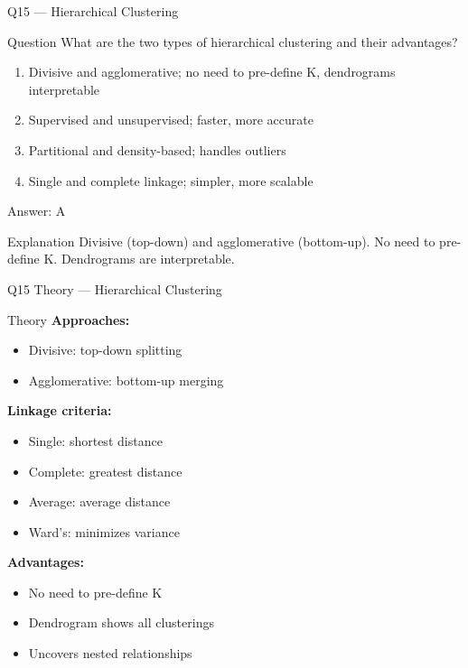 \documentclass[aspectratio=169,8pt]{beamer}
\begin{document}
	\begin{frame}{Q15 --- Hierarchical Clustering}
		\begin{block}{Question}
			What are the two types of hierarchical clustering and their advantages?
		\end{block}
		\begin{enumerate}[label=\Alph*.]
			\item Divisive and agglomerative; no need to pre-define K, dendrograms interpretable
			\item Supervised and unsupervised; faster, more accurate
			\item Partitional and density-based; handles outliers
			\item Single and complete linkage; simpler, more scalable
		\end{enumerate}
		\begin{exampleblock}{Answer: A}
		\end{exampleblock}
		\begin{block}{Explanation}
			Divisive (top-down) and agglomerative (bottom-up). No need to pre-define K. Dendrograms are interpretable.
		\end{block}
	\end{frame}
	
	\begin{frame}{Q15 Theory --- Hierarchical Clustering}
		\begin{block}{Theory}
			\textbf{Approaches:}
			\begin{itemize}
				\item Divisive: top-down splitting
				\item Agglomerative: bottom-up merging
			\end{itemize}
			\textbf{Linkage criteria:}
			\begin{itemize}
				\item Single: shortest distance
				\item Complete: greatest distance
				\item Average: average distance
				\item Ward's: minimizes variance
			\end{itemize}
			\textbf{Advantages:}
			\begin{itemize}
				\item No need to pre-define K
				\item Dendrogram shows all clusterings
				\item Uncovers nested relationships
			\end{itemize}
		\end{block}
	\end{frame}
	
\end{document}
